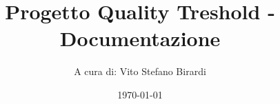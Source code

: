 
\newcommand{\Titolo}{Progetto Quality Treshold - Documentazione}
\newcommand{\Data}{\today}
\newcommand{\Materia}{}


\newcommand{\image}[3]{
    \begin{figure}[h!]
    \centering
    \texttt{[image: \#1]}
    \caption{#2}
    \label{#3}
\end{figure}}


\documentclass[a4paper]{article}
\usepackage{amsmath}
\usepackage{amssymb}


\usepackage[italian]{babel}


\usepackage{fancyvrb}
\usepackage{fancyhdr, lastpage}


\usepackage{cancel}
\usepackage{etoolbox}
\usepackage{xcolor}
\usepackage{subfig}
\usepackage{tikz, lmodern}
\usepackage[T1]{fontenc}
\usepackage[most]{tcolorbox}
\usepackage{graphicx}
\usepackage{hyperref}
\usepackage{parskip}
\usepackage{multicol}
\pagestyle{fancy}


\hypersetup{
    colorlinks=true,
    linkcolor=blue,
    filecolor=magenta, 
    urlcolor=blue,
    pdfpagemode=FullScreen
}


\lhead{\Data}
\lfoot{\Materia}
\renewcommand{\footrulewidth}{0.5pt}
\fancyfoot[C]{}
\patchcmd{\chapter}{\thispagestyle{plain}}{\thispagestyle{fancy}}{}


\title{\Titolo}
\author{
    A cura di: 
    Vito Stefano Birardi
}
\date{\Data}




\maketitle
\newpage
\hypertarget{toc}{\tableofcontents}
\newpage



